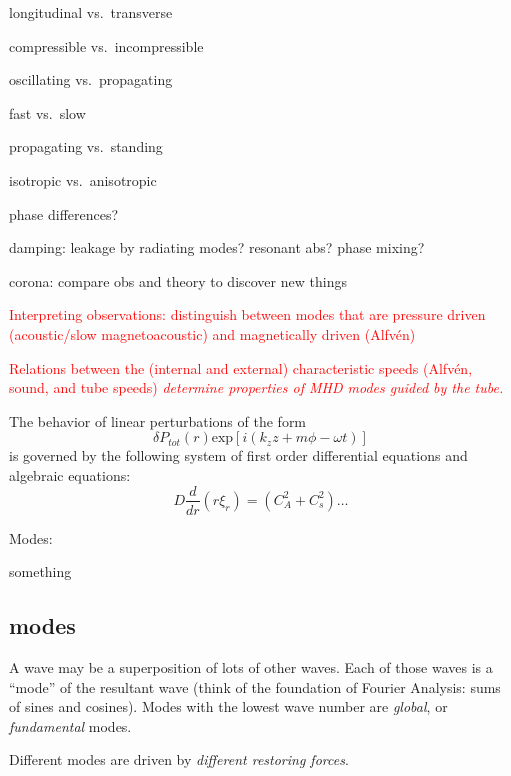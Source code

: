 \documentclass[12pt]{article}
\begin{document}
\begin{itemize*}
\begin{itemize*}
                \begin{itemize*}
                    \item longitudinal vs.\ transverse
                    \item compressible vs.\ incompressible
                    \item oscillating vs.\ propagating
                    \item fast vs.\ slow
                    \item propagating vs.\ standing
                    \item isotropic vs.\ anisotropic
                    \item phase differences?
                \end{itemize*}
            \item damping: leakage by radiating modes? resonant abs? phase mixing?
            \item corona: compare obs and theory to discover new things
        \end{itemize*}
    \item \textcolor{red}{Interpreting observations: distinguish between modes that are
        pressure driven (acoustic/slow magnetoacoustic) and magnetically
        driven (Alfv\'en)}
    \item \textcolor{red}{Relations between the (internal and external)
        characteristic speeds (Alfv\'en, sound, and tube speeds)
        \emph{determine properties of MHD modes guided by the tube.}}
    \item The behavior of linear perturbations of the form
        $$ \delta P_{tot}(r)\textrm{exp}\left[i(k_zz+m\phi-\omega t)\right]  $$
        is governed by  the following system of first order differential
        equations and algebraic equations:
        $$ D\frac{d}{dr}(r\xi_r) = (C_A^2+C_s^2)\ldots  $$
    \item Modes:
        \begin{itemize*}
            \item something
        \end{itemize*}
\end{itemize*}


\subsection*{modes}
A wave may be a superposition of lots of other waves. Each of those
waves is a ``mode'' of the resultant wave (think of the foundation
of Fourier Analysis: sums of sines and cosines).
Modes with the lowest wave number are \emph{global}, or
\emph{fundamental} modes.
\begin{itemize*}
    \item Different modes are driven by \emph{different restoring forces}.
\end{itemize*}
\end{document}
